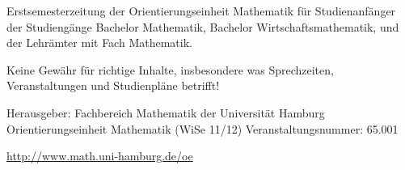Erstsemesterzeitung der Orientierungseinheit Mathematik für Studienanfänger der
Studiengänge Bachelor Mathematik, Bachelor Wirtschaftsmathematik, und der
Lehrämter mit Fach Mathematik.

\medskip Keine Gewähr für richtige Inhalte, insbesondere was Sprechzeiten,
Veranstaltungen und Studienpläne betrifft!

\medskip Herausgeber: \newline
Fachbereich Mathematik der Universität Hamburg \newline
Orientierungseinheit Mathematik (WiSe 11/12) \newline
Veranstaltungsnummer: 65.001

\url{http://www.math.uni-hamburg.de/oe}
